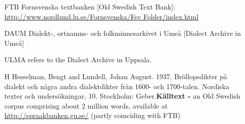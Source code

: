 \begin{itemize}
\item[FTB]
  Fornsvenska textbanken [Old Swedish Text Bank]: \url{http://www.nordlund.lu.se/Fornsvenska/Fsv Folder/index.html} 

\item[DAUM]
  Dialekt-, ortnamns- och folkminnesarkivet i Umeå [Dialect Archive in Umeå] 

\item[ULMA]
 refers to the Dialect Archive in Uppsala. 

\item[H]
  Hesselman, Bengt and Lundell, Johan August. 1937. Bröllopsdikter på dialekt och några andra dialektdikter från 1600- och 1700-talen. Nordiska texter och undersökningar, 10. Stockholm: Geber.\textbf{Källtext - }an Old Swedish corpus comprising about 2 million words, available at \url{http://spraakbanken.gu.se/} (partly coinciding with FTB)
\end{itemize}